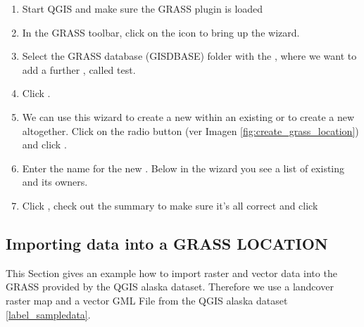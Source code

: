 \begin{enumerate}
  \item Start QGIS and make sure the GRASS plugin is loaded
  \item In the GRASS toolbar, click on the 
   icon to bring up the 
   wizard.
  \item Select the GRASS database (GISDBASE) folder  
  with the , where we want to add a further 
  , called test.
  \item Click . 
  \item We can use this wizard to create a new  within an 
  existing  or to create a new  
  altogether. Click on the radio button  
  (ver Imagen \ref{fig:create_grass_location}) and click .
  \item Enter the name  for the new . Below 
  in the wizard you see a list of existing  and its owners.
  \item Click , check out the summary to make sure it's all 
  correct and click  
\end{enumerate}

\subsection{Importing data into a GRASS LOCATION}\label{sec:import_loc_data}

This Section gives an example how to import raster and vector data into the 
 GRASS  provided by the QGIS alaska 
dataset. Therefore we use a landcover raster map  
and a vector GML File  from the QGIS alaska 
dataset \ref{label_sampledata}.


